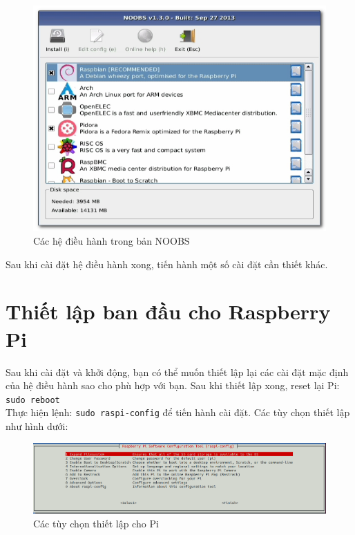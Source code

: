 \begin{list}{--}{}
\begin{figure}[!h]
\begin{center}
\includegraphics[scale=.5]{setup-os/images/NOOBS}
\end{center}
\caption{Các hệ điều hành trong bản NOOBS}
\end{figure}
\item Sau khi cài đặt hệ điều hành xong, tiến hành một số cài đặt cần thiết khác.
\end{list}
\section{Thiết lập ban đầu cho Raspberry Pi}
Sau khi cài đặt và khởi động, bạn có thể muốn thiết lập lại các cài đặt mặc định của hệ điều hành sao cho phù hợp với bạn. Sau khi thiết lập xong, reset lại Pi: \verb|sudo reboot|\\

Thực hiện lệnh: \verb|sudo raspi-config| để tiến hành cài đặt. Các tùy chọn thiết lập như hình dưới:
\begin{figure}[!h]
\begin{center}
\includegraphics[scale=.35]{setup-os/images/raspi}
\end{center}
\caption{Các tùy chọn thiết lập cho Pi}
\end{figure}
